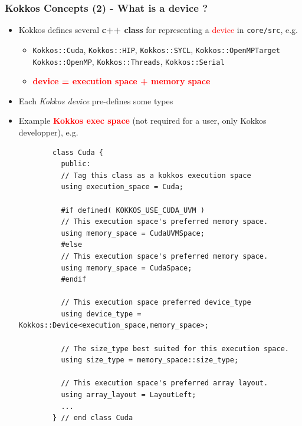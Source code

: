 \begin{frame}[fragile=singleslide]
  \frametitle{Kokkos Concepts (2) - What is a device ?}

  \begin{itemize}
  \item Kokkos defines several {\bf c++ class} for representing a \textcolor{red}{device} in \texttt{core/src}, e.g.
    \begin{itemize}
    \item {\tt Kokkos::Cuda}, {\tt Kokkos::HIP}, {\tt Kokkos::SYCL}, {\tt Kokkos::OpenMPTarget} {\tt Kokkos::OpenMP}, {\tt Kokkos::Threads}, {\tt Kokkos::Serial}
    \item \textcolor{red}{\bf device = execution space + memory space}
    \end{itemize}
  \item Each \textit{Kokkos device} pre-defines some types
  \item Example \textcolor{red}{\textbf{Kokkos exec space}} (not required for a user, only Kokkos developper), e.g.\\
    {\tiny
      \begin{verbatim}
        class Cuda {
          public:
          // Tag this class as a kokkos execution space
          using execution_space = Cuda;

          #if defined( KOKKOS_USE_CUDA_UVM )
          // This execution space's preferred memory space.
          using memory_space = CudaUVMSpace;
          #else
          // This execution space's preferred memory space.
          using memory_space = CudaSpace;
          #endif

          // This execution space preferred device_type
          using device_type = Kokkos::Device<execution_space,memory_space>;

          // The size_type best suited for this execution space.
          using size_type = memory_space::size_type;

          // This execution space's preferred array layout.
          using array_layout = LayoutLeft;
          ...
        } // end class Cuda
      \end{verbatim}
    }
  \end{itemize}

\end{frame}

